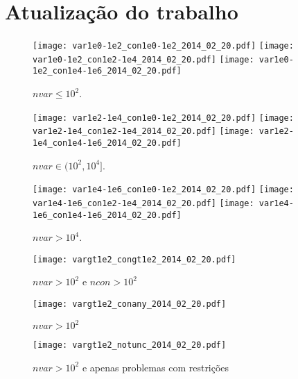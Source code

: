 \documentclass{article}
\begin{document}
\section{Atualização do trabalho}

\begin{figure}[H]
\centering
\texttt{[image: var1e0-1e2\_con1e0-1e2\_2014\_02\_20.pdf]}
\texttt{[image: var1e0-1e2\_con1e2-1e4\_2014\_02\_20.pdf]}
\texttt{[image: var1e0-1e2\_con1e4-1e6\_2014\_02\_20.pdf]}
\caption{ $nvar \leq 10^2$. }
\label{fig:nvar_small}
\end{figure}
\begin{figure}[H]
\centering
\texttt{[image: var1e2-1e4\_con1e0-1e2\_2014\_02\_20.pdf]}
\texttt{[image: var1e2-1e4\_con1e2-1e4\_2014\_02\_20.pdf]}
\texttt{[image: var1e2-1e4\_con1e4-1e6\_2014\_02\_20.pdf]}
\caption{ $nvar \in (10^2,10^4]$. }
\label{fig:nvar_medium}
\end{figure}
\begin{figure}[H]
\centering
\texttt{[image: var1e4-1e6\_con1e0-1e2\_2014\_02\_20.pdf]}
\texttt{[image: var1e4-1e6\_con1e2-1e4\_2014\_02\_20.pdf]}
\texttt{[image: var1e4-1e6\_con1e4-1e6\_2014\_02\_20.pdf]}
\caption{ $nvar > 10^4$. }
\label{fig:nvar_big}
\end{figure}

\begin{figure}[H]
\centering
\texttt{[image: vargt1e2\_congt1e2\_2014\_02\_20.pdf]}
\caption{ $nvar > 10^2$ e $ncon > 10^2$ }
\label{fig:both_medium_and_big}
\end{figure}

\begin{figure}[H]
\centering
\texttt{[image: vargt1e2\_conany\_2014\_02\_20.pdf]}
\caption{ $nvar > 10^2$ }
\label{fig:nvar_medium_and_big}
\end{figure}

\begin{figure}[H]
\centering
\texttt{[image: vargt1e2\_notunc\_2014\_02\_20.pdf]}
\caption{ $nvar > 10^2$ e apenas problemas com restrições }
\label{fig:nvar_medium_and_big_not_unc}
\end{figure}
\end{document}
